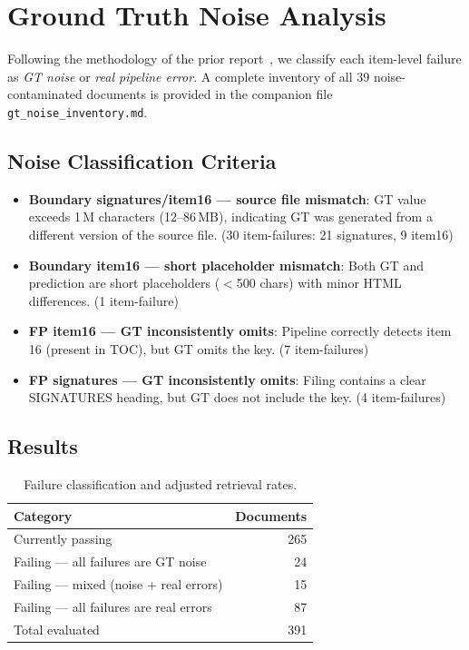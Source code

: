 \documentclass[11pt,a4paper]{article}
\begin{document}
\section{Ground Truth Noise Analysis}\label{sec:noise}

Following the methodology of the prior report~\cite{bi2026anchor}, we classify each item-level failure as \emph{GT noise} or \emph{real pipeline error}. A complete inventory of all 39 noise-contaminated documents is provided in the companion file \texttt{gt\_noise\_inventory.md}.

\subsection{Noise Classification Criteria}

\begin{itemize}[nosep]
    \item \textbf{Boundary signatures/item16 --- source file mismatch}: GT value exceeds 1\,M characters (12--86\,MB), indicating GT was generated from a different version of the source file. (30 item-failures: 21 signatures, 9 item16)
    \item \textbf{Boundary item16 --- short placeholder mismatch}: Both GT and prediction are short placeholders ($<$500 chars) with minor HTML differences. (1 item-failure)
    \item \textbf{FP item16 --- GT inconsistently omits}: Pipeline correctly detects item 16 (present in TOC), but GT omits the key. (7 item-failures)
    \item \textbf{FP signatures --- GT inconsistently omits}: Filing contains a clear SIGNATURES heading, but GT does not include the key. (4 item-failures)
\end{itemize}

\subsection{Results}

\begin{table}[H]
\centering
\caption{Failure classification and adjusted retrieval rates.}
\label{tab:noise}
\begin{tabular}{lr}
\toprule
\textbf{Category} & \textbf{Documents}\\
\midrule
Currently passing & 265\\
Failing --- all failures are GT noise & 24\\
Failing --- mixed (noise + real errors) & 15\\
Failing --- all failures are real errors & 87\\
\midrule
Total evaluated & 391\\
\bottomrule
\end{tabular}
\end{table}
\end{document}
